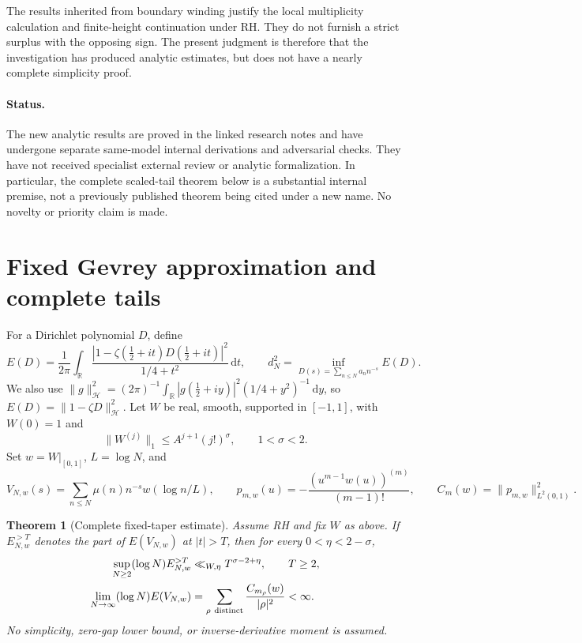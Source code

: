 \documentclass[11pt]{article}
\newtheorem{theorem}{Theorem}
\newcommand{\dd}{\,\mathrm d}
\begin{document}
The results inherited from boundary winding justify the local
multiplicity calculation and finite-height continuation under RH.
They do not furnish a strict surplus with the opposing sign.
The present judgment is therefore that the investigation has produced
analytic estimates, but does not have a nearly complete simplicity
proof.

\paragraph{Status.}
The new analytic results are proved in the linked research notes and
have undergone separate same-model internal derivations and adversarial
checks. They have not received specialist external review or analytic
formalization. In particular, the complete scaled-tail theorem below is
a substantial internal premise, not a previously published theorem
being cited under a new name. No novelty or priority claim is made.

\section{Fixed Gevrey approximation and complete tails}
For a Dirichlet polynomial \(D\), define
\[
 E(D)=\frac1{2\pi}\int_{\mathbb R}
  \frac{|1-\zeta(\frac12+it)D(\frac12+it)|^2}{1/4+t^2}\dd t,
 \qquad
 d_N^2=\inf_{D(s)=\sum_{n\le N}a_n n^{-s}}E(D).
\]
We also use \(\|g\|_{\mathcal H}^2=(2\pi)^{-1}
\int_{\mathbb R}|g(\frac12+iy)|^2(1/4+y^2)^{-1}\dd y\),
so \(E(D)=\|1-\zeta D\|_{\mathcal H}^2\).
Let \(W\) be real, smooth, supported in \([-1,1]\), with \(W(0)=1\)
and
\[
 \|W^{(j)}\|_1\le A^{j+1}(j!)^\sigma,\qquad 1<\sigma<2.
\]
Set \(w=W|_{[0,1]}\), \(L=\log N\), and
\[
 V_{N,w}(s)=\sum_{n\le N}\mu(n)n^{-s}w(\log n/L),\qquad
 p_{m,w}(u)=-\frac{(u^{m-1}w(u))^{(m)}}{(m-1)!},\qquad
 C_m(w)=\|p_{m,w}\|_{L^2(0,1)}^2.
\]
\begin{theorem}[Complete fixed-taper estimate]\label{thm:ST}
Assume RH and fix \(W\) as above. If \(E_{N,w}^{>T}\) denotes the
part of \(E(V_{N,w})\) at \(|t|>T\), then for every
\(0<\eta<2-\sigma\),
\begin{align}
 \sup_{N\ge2}(\log N)E_{N,w}^{>T}
      &\ll_{W,\eta}T^{\sigma-2+\eta},\qquad T\ge2,
       \label{eq:tail}\\
 \lim_{N\to\infty}(\log N)E(V_{N,w})
      &=\sum_{\rho\ {\rm distinct}}
                \frac{C_{m_\rho}(w)}{|\rho|^2}<\infty.
       \label{eq:fixed}
\end{align}
No simplicity, zero-gap lower bound, or inverse-derivative moment is
assumed.
\end{theorem}
\end{document}

